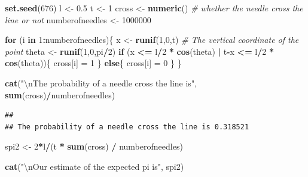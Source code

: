 \documentclass[]{article}
\newenvironment{Shaded}{\begin{snugshade}}{\end{snugshade}}
\newcommand{\KeywordTok}[1]{\textcolor[rgb]{0.13,0.29,0.53}{\textbf{#1}}}
\newcommand{\DecValTok}[1]{\textcolor[rgb]{0.00,0.00,0.81}{#1}}
\newcommand{\FloatTok}[1]{\textcolor[rgb]{0.00,0.00,0.81}{#1}}
\newcommand{\CharTok}[1]{\textcolor[rgb]{0.31,0.60,0.02}{#1}}
\newcommand{\StringTok}[1]{\textcolor[rgb]{0.31,0.60,0.02}{#1}}
\newcommand{\CommentTok}[1]{\textcolor[rgb]{0.56,0.35,0.01}{\textit{#1}}}
\newcommand{\ControlFlowTok}[1]{\textcolor[rgb]{0.13,0.29,0.53}{\textbf{#1}}}
\newcommand{\OperatorTok}[1]{\textcolor[rgb]{0.81,0.36,0.00}{\textbf{#1}}}
\newcommand{\NormalTok}[1]{#1}
\begin{document}
\begin{Shaded}
\begin{Highlighting}[]
\KeywordTok{set.seed}\NormalTok{(}\DecValTok{676}\NormalTok{)}
\NormalTok{l <-}\StringTok{ }\FloatTok{0.5}
\NormalTok{t <-}\StringTok{ }\DecValTok{1}
\NormalTok{cross <-}\StringTok{ }\KeywordTok{numeric}\NormalTok{() }\CommentTok{# whether the needle cross the line or not}
\NormalTok{numberofneedles <-}\StringTok{ }\DecValTok{1000000}

\ControlFlowTok{for}\NormalTok{ (i }\ControlFlowTok{in} \DecValTok{1}\OperatorTok{:}\NormalTok{numberofneedles)\{}
\NormalTok{  x <-}\StringTok{ }\KeywordTok{runif}\NormalTok{(}\DecValTok{1}\NormalTok{,}\DecValTok{0}\NormalTok{,t) }\CommentTok{# The vertical coordinate of the point}
\NormalTok{  theta <-}\StringTok{ }\KeywordTok{runif}\NormalTok{(}\DecValTok{1}\NormalTok{,}\DecValTok{0}\NormalTok{,pi}\OperatorTok{/}\DecValTok{2}\NormalTok{)}
  \ControlFlowTok{if}\NormalTok{ (x }\OperatorTok{<=}\StringTok{ }\NormalTok{l}\OperatorTok{/}\DecValTok{2} \OperatorTok{*}\StringTok{ }\KeywordTok{cos}\NormalTok{(theta) }\OperatorTok{|}\StringTok{ }\NormalTok{t}\OperatorTok{-}\NormalTok{x }\OperatorTok{<=}\StringTok{ }\NormalTok{l}\OperatorTok{/}\DecValTok{2} \OperatorTok{*}\StringTok{ }\KeywordTok{cos}\NormalTok{(theta))\{}
\NormalTok{    cross[i] =}\StringTok{ }\DecValTok{1}
\NormalTok{  \}}
  \ControlFlowTok{else}\NormalTok{\{}
\NormalTok{    cross[i] =}\StringTok{ }\DecValTok{0}
\NormalTok{  \}}
\NormalTok{\}}

\KeywordTok{cat}\NormalTok{(}\StringTok{"}\CharTok{\textbackslash{}n}\StringTok{The probability of a needle cross the line is"}\NormalTok{, }\KeywordTok{sum}\NormalTok{(cross)}\OperatorTok{/}\NormalTok{numberofneedles)}
\end{Highlighting}
\end{Shaded}

\begin{verbatim}
## 
## The probability of a needle cross the line is 0.318521
\end{verbatim}

\begin{Shaded}
\begin{Highlighting}[]
\NormalTok{spi2 <-}\StringTok{ }\DecValTok{2}\OperatorTok{*}\NormalTok{l}\OperatorTok{/}\NormalTok{(t }\OperatorTok{*}\StringTok{ }\KeywordTok{sum}\NormalTok{(cross) }\OperatorTok{/}\StringTok{ }\NormalTok{numberofneedles)}

\KeywordTok{cat}\NormalTok{(}\StringTok{"}\CharTok{\textbackslash{}n}\StringTok{Our estimate of the expected pi is"}\NormalTok{, spi2)}
\end{Highlighting}
\end{Shaded}
\end{document}
